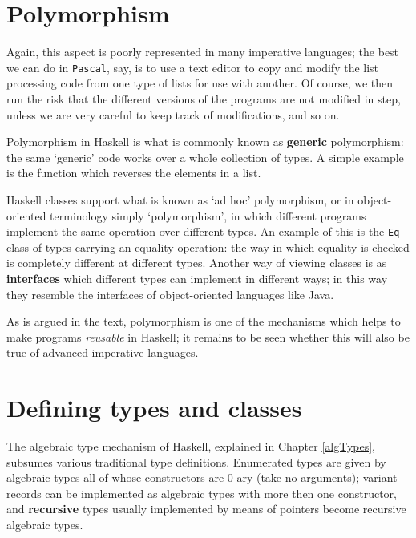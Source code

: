 \section*{Polymorphism}
\vspace{-2pt}

Again, this aspect is poorly represented in many imperative languages; the
best we can do in \texttt{Pascal}, say, is to use a text editor to copy and
modify the list processing code from one type of lists for use with another.
Of course, we then run the risk that the different versions of the programs
are not modified in step, unless we are very careful to keep track of
modifications, and so on.


Polymorphism in Haskell is what is commonly known as
\textbf{generic} polymorphism: the same `generic' code works over a
whole collection of types. A simple example is the function which 
reverses the elements in a list.

Haskell classes support what is known as `ad
hoc' polymorphism, or in object-oriented terminology simply `polymorphism', 
in which different programs implement the same
operation over different types. An example of this is the \texttt{Eq}
class of types carrying an equality operation: the way in which equality
is checked is completely different at different types. Another way of
viewing classes is as \textbf{interfaces} which different types
can implement in different ways; in this way they resemble the
interfaces of object-oriented languages like Java.

As is argued in the text, polymorphism is one of the mechanisms which helps to
make programs {\em reusable\/} in Haskell; it remains to be seen whether this
will also be true of advanced imperative languages.
\vspace{-2pt}

\section*{Defining types and classes}
\vspace{-2pt}

The algebraic type mechanism of Haskell, explained in Chapter \ref{algTypes},
subsumes various traditional type definitions. Enumerated types are given by
algebraic types all of whose constructors are 0-ary (take no arguments);
variant records can be implemented as algebraic types with more then one
constructor, and \textbf{recursive} types usually implemented by means of
pointers become recursive algebraic types.


